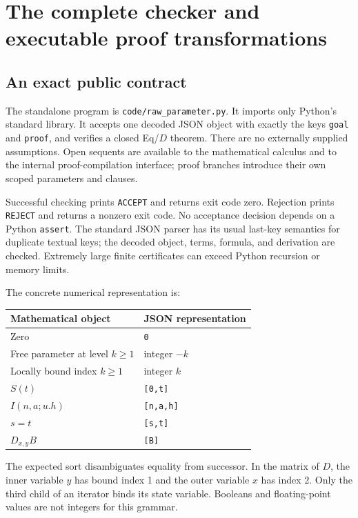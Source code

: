 \section{The complete checker and executable proof transformations}

\subsection{An exact public contract}

The standalone program is \texttt{code/raw\_parameter.py}. It imports only
Python's standard library. It accepts one decoded JSON object with
exactly the keys \texttt{goal} and \texttt{proof}, and verifies a closed
Eq/$D$ theorem. There are no externally supplied assumptions. Open
sequents are available to the mathematical calculus and to the internal
proof-compilation interface; proof branches introduce their own scoped
parameters and clauses.

Successful checking prints \texttt{ACCEPT} and returns exit code zero.
Rejection prints \texttt{REJECT} and returns a nonzero exit code. No
acceptance decision depends on a Python \texttt{assert}. The standard
JSON parser has its usual last-key semantics for duplicate textual keys;
the decoded object, terms, formula, and derivation are checked. Extremely
large finite certificates can exceed Python recursion or memory limits.

The concrete numerical representation is:
\begin{center}
\begin{tabular}{ll}
\toprule
Mathematical object & JSON representation\\
\midrule
Zero & \texttt{0}\\
Free parameter at level $k\geq1$ & integer $-k$\\
Locally bound index $k\geq1$ & integer $k$\\
$S(t)$ & \texttt{[0,t]}\\
$I(n,a;u.h)$ & \texttt{[n,a,h]}\\
$s=t$ & \texttt{[s,t]}\\
$D_{x,y}B$ & \texttt{[B]}\\
\bottomrule
\end{tabular}
\end{center}
The expected sort disambiguates equality from successor. In the matrix of
$D$, the inner variable $y$ has bound index 1 and the outer variable $x$
has index 2. Only the third child of an iterator binds its state variable.
Booleans and floating-point values are not integers for this grammar.

